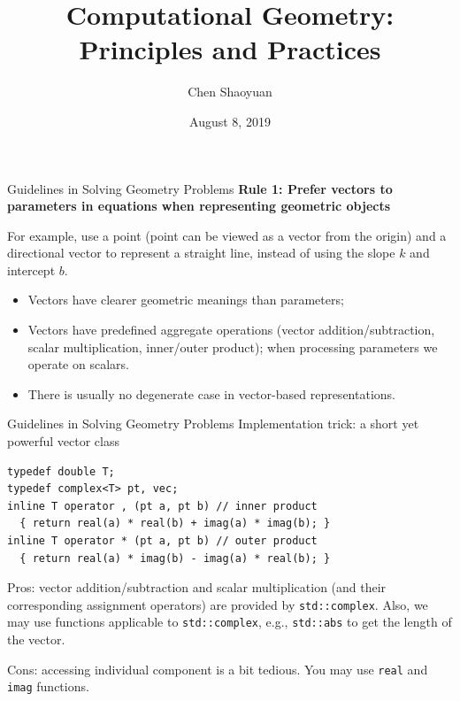 \documentclass{beamer}
\title{Computational Geometry: \\ Principles and Practices}
\institute{Nanjing University ICPC Training Team}
\author{Chen Shaoyuan}
\date{August 8, 2019}
\begin{document}
\begin{frame}
  \titlepage
\end{frame}

\begin{frame}{Guidelines in Solving Geometry Problems}
	\textbf{Rule 1: Prefer vectors to parameters in equations when representing geometric objects}
	
	 For example, use a point (point can be viewed as a vector from the origin) and a directional vector to represent a straight line, instead of using the slope $k$ and intercept $b$.
	 
	 \pause
    \begin{itemize}[<+->]
		\item Vectors have clearer geometric meanings than parameters;
		\item Vectors have predefined aggregate operations (vector addition/subtraction, scalar multiplication, inner/outer product); when processing parameters we operate on scalars.
		\item There is usually no degenerate case in vector-based representations.
	\end{itemize}
\end{frame}

\begin{frame}[fragile]{Guidelines in Solving Geometry Problems}
    Implementation trick: a short yet powerful vector class
    
\begin{lstlisting}
typedef double T;
typedef complex<T> pt, vec;
inline T operator , (pt a, pt b) // inner product
  { return real(a) * real(b) + imag(a) * imag(b); }
inline T operator * (pt a, pt b) // outer product
  { return real(a) * imag(b) - imag(a) * real(b); }
\end{lstlisting}

\pause

Pros: vector addition/subtraction and scalar multiplication (and their corresponding assignment operators) are provided by \lstinline|std::complex|. Also, we may use functions applicable to \lstinline|std::complex|, e.g., \lstinline|std::abs| to get the length of the vector.

Cons: accessing individual component is a bit tedious. You may use \lstinline|real| and \lstinline|imag| functions.
\end{frame}
\end{document}
